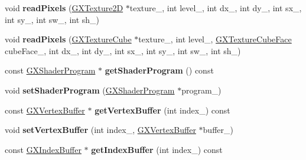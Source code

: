 \begin{DoxyCompactItemize}
\item 
void {\bfseries read\+Pixels} (\hyperlink{class_magnum_1_1_g_x_texture2_d}{G\+X\+Texture2D} $\ast$texture\+\_\+, int level\+\_\+, int dx\+\_\+, int dy\+\_\+, int sx\+\_\+, int sy\+\_\+, int sw\+\_\+, int sh\+\_\+)\hypertarget{class_magnum_1_1_g_x_context_ae62a2adb036d7640f9e0d322f8a06789}{}\label{class_magnum_1_1_g_x_context_ae62a2adb036d7640f9e0d322f8a06789}

\item 
void {\bfseries read\+Pixels} (\hyperlink{class_magnum_1_1_g_x_texture_cube}{G\+X\+Texture\+Cube} $\ast$texture\+\_\+, int level\+\_\+, \hyperlink{class_magnum_1_1_g_x_texture_cube_face}{G\+X\+Texture\+Cube\+Face} cube\+Face\+\_\+, int dx\+\_\+, int dy\+\_\+, int sx\+\_\+, int sy\+\_\+, int sw\+\_\+, int sh\+\_\+)\hypertarget{class_magnum_1_1_g_x_context_ae702cb140e5e7c9f6357b90c35bd4ee2}{}\label{class_magnum_1_1_g_x_context_ae702cb140e5e7c9f6357b90c35bd4ee2}

\item 
const \hyperlink{class_magnum_1_1_g_x_shader_program}{G\+X\+Shader\+Program} $\ast$ {\bfseries get\+Shader\+Program} () const \hypertarget{class_magnum_1_1_g_x_context_af74befdccce27cc038f6ed0189868760}{}\label{class_magnum_1_1_g_x_context_af74befdccce27cc038f6ed0189868760}

\item 
void {\bfseries set\+Shader\+Program} (\hyperlink{class_magnum_1_1_g_x_shader_program}{G\+X\+Shader\+Program} $\ast$program\+\_\+)\hypertarget{class_magnum_1_1_g_x_context_a5c46606bfd45a766cce6d44668b7803c}{}\label{class_magnum_1_1_g_x_context_a5c46606bfd45a766cce6d44668b7803c}

\item 
const \hyperlink{class_magnum_1_1_g_x_vertex_buffer}{G\+X\+Vertex\+Buffer} $\ast$ {\bfseries get\+Vertex\+Buffer} (int index\+\_\+) const \hypertarget{class_magnum_1_1_g_x_context_ac45a798d1e64ec28c93b9ed4d15af0be}{}\label{class_magnum_1_1_g_x_context_ac45a798d1e64ec28c93b9ed4d15af0be}

\item 
void {\bfseries set\+Vertex\+Buffer} (int index\+\_\+, \hyperlink{class_magnum_1_1_g_x_vertex_buffer}{G\+X\+Vertex\+Buffer} $\ast$buffer\+\_\+)\hypertarget{class_magnum_1_1_g_x_context_ace0081c29461b0a0239ed116ca63cd4a}{}\label{class_magnum_1_1_g_x_context_ace0081c29461b0a0239ed116ca63cd4a}

\item 
const \hyperlink{class_magnum_1_1_g_x_index_buffer}{G\+X\+Index\+Buffer} $\ast$ {\bfseries get\+Index\+Buffer} (int index\+\_\+) const \hypertarget{class_magnum_1_1_g_x_context_a40da427018dd17072bbf0ca39d51df8c}{}\label{class_magnum_1_1_g_x_context_a40da427018dd17072bbf0ca39d51df8c}


\end{DoxyCompactItemize}
